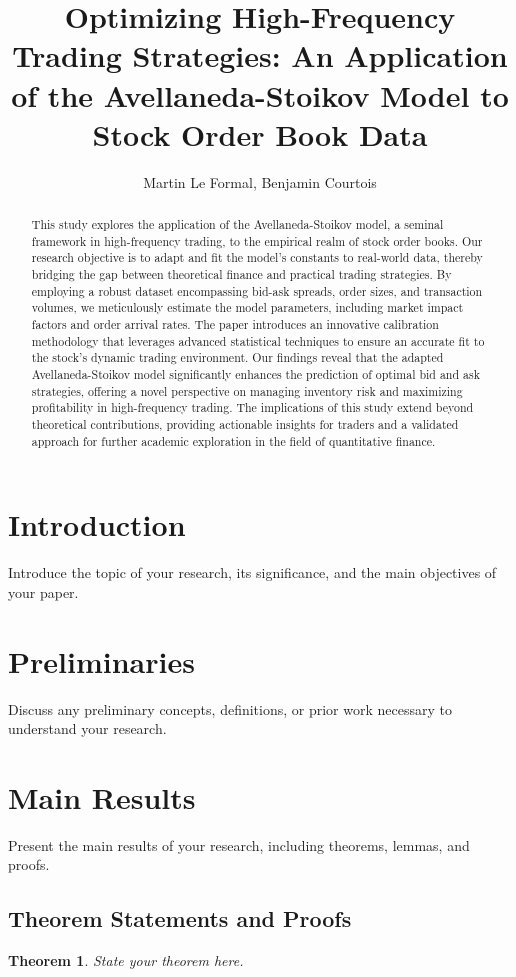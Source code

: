 \documentclass[12pt]{article}
\title{Optimizing High-Frequency Trading Strategies: An Application of the Avellaneda-Stoikov Model to Stock Order Book Data}
\author{Martin Le Formal, Benjamin Courtois}
\newtheorem{theorem}{Theorem}[section]
\theoremstyle{definition}
\theoremstyle{remark}
\begin{document}
\maketitle

\begin{abstract}
\noindent
This study explores the application of the Avellaneda-Stoikov model, a seminal framework in high-frequency trading, to the empirical realm of stock order books.
Our research objective is to adapt and fit the model's constants to real-world data, thereby bridging the gap between theoretical finance and practical trading strategies.
By employing a robust dataset encompassing bid-ask spreads, order sizes, and transaction volumes, we meticulously estimate the model parameters, including market impact factors and order arrival rates.
The paper introduces an innovative calibration methodology that leverages advanced statistical techniques to ensure an accurate fit to the stock's dynamic trading environment.
Our findings reveal that the adapted Avellaneda-Stoikov model significantly enhances the prediction of optimal bid and ask strategies, offering a novel perspective on managing inventory risk and maximizing profitability in high-frequency trading.
The implications of this study extend beyond theoretical contributions, providing actionable insights for traders and a validated approach for further academic exploration in the field of quantitative finance.
\end{abstract}


\section{Introduction}
Introduce the topic of your research, its significance, and the main objectives of your paper.

\section{Preliminaries}
Discuss any preliminary concepts, definitions, or prior work necessary to understand your research.

\section{Main Results}
Present the main results of your research, including theorems, lemmas, and proofs.

\subsection{Theorem Statements and Proofs}
\begin{theorem}
State your theorem here.
\end{theorem}
\end{document}
